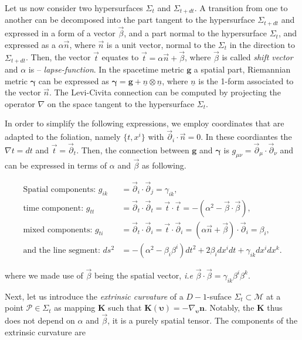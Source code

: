 \documentclass[11pt,a4paper,headinclude=true,DIV=14,BCOR=8mm,chapterprefix,listof=totoc,twoside,openright,abstracton]{scrbook}
\begin{document}
Let us now consider two hypersurfaces $\Sigma_t$ and $\Sigma_{t+dt}$. A transition from one to another can be decomposed into the part tangent to the hypersurface $\Sigma_{t+dt}$ and expressed in a form of a vector $\vec{\beta}$, and a part normal to the hypersurface $\Sigma_t$, and expressed as a $\alpha \vec{n}$, where $\vec{n}$ is a unit vector, normal to the $\Sigma_t$ in the direction to $\Sigma_{t+dt}$. Then, the vector $\vec{t}$ equates to $\vec{t} = \alpha\vec{n}+\vec{\beta}$, where $\vec{\beta}$ is called \textit{shift vector} and $\alpha$ is -- \textit{lapse-function}. In the  spacetime metric $\boldsymbol{g}$ a spatial part, Riemannian metric $\boldsymbol{\gamma}$ can be expressed as $\boldsymbol{\gamma} = \boldsymbol{g} + \underline{n} \otimes \underline{n} $, where $\underline{n}$ is the 1-form associated to the vector $\vec{n}$. The Levi-Civita connection can be computed by projecting the operator $\nabla$ on the space tangent to the hypersurface $\Sigma_t$.

In order to simplify the following expressions, we employ coordinates that are adapted to the foliation, namely $\{t, x^i\}$ with $\vec{\partial}_i\cdot \vec{n} = 0$. In these coordiantes the $\nabla t = dt$ and $\vec{t} = \vec{\partial}_t$. Then, the connection between $\boldsymbol{g}$ and $\boldsymbol{\gamma}$ is $g_{\mu\nu}=\vec{\partial}_{\mu}\cdot\vec{\partial}_{\nu} $ and can be expressed in terms of $\alpha$ and $\vec{\beta}$ as following.

\begin{align*}
\text{Spatial components: } g_{ik}&=\vec{\partial}_{i}\cdot\vec{\partial}_{j} =\gamma_{ik}, \\
\text{time component: } g_{tt} &= \vec{\partial}_{t}\cdot\vec{\partial}_{t} = \vec{t}\cdot\vec{t} = - (\alpha^2-\vec{\beta}\cdot\vec{\beta}), \\
\text{mixed components: } g_{ti} &= \vec{\partial}_{t}\cdot\vec{\partial}_{i} = \vec{t}\cdot\vec{\partial}_i = (\alpha\vec{n}+\vec{\beta})\cdot\vec{\partial}_i=\beta_i, \\
\text{and the line segment: }ds^2 &= -(\alpha^2-\beta_i\beta^i)dt^2 +2\beta_i dx^i dt + \gamma_{ik} dx^i dx^k.
\end{align*}

where we made use of $\vec{\beta}$ being the spatial vector, \textit{i.e} $\vec{\beta}\cdot\vec{\beta}=\gamma_{ik}\beta^i\beta^k$.


Next, let us introduce the \textit{extrinsic curvature} of a $D-1$-suface $\Sigma_t\subset\mathcal{M}$ at a point $\mathcal{P}\in\Sigma_t$ as mapping $\boldsymbol{K}$ such that $\boldsymbol{K}(\boldsymbol{\upsilon}) = -\nabla_{\boldsymbol{\upsilon}}\boldsymbol{n}$. Notably, the $\boldsymbol{K}$ thus does not depend on $\alpha$ and $\vec{\beta}$, it is a purely spatial tensor. The components of the extrinsic curvature are
\end{document}
